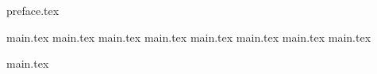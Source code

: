 \documentclass{myclass}
\begin{document}

\frontmatter

\maketitle

\tableofcontents

{preface.tex}


\mainmatter

{main.tex}
{main.tex}
{main.tex}
{main.tex}
{main.tex}
{main.tex}
{main.tex}
{main.tex}

\appendix
{main.tex}


\backmatter

\printindex
\end{document}
